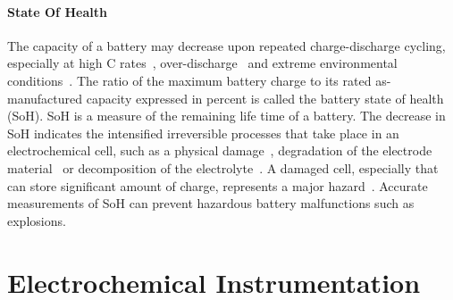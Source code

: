 \paragraph{State Of Health}
The capacity of a battery may decrease upon repeated charge-discharge cycling, especially at high C rates~\cite{Guan2018,Ouyang2020}, over-discharge~\cite{Ma2020} and extreme environmental conditions~\cite{Zhang2022}. The ratio of the maximum battery charge to its rated as-manufactured capacity expressed in percent is called the battery state of health (SoH). SoH is a measure of the remaining life time of a battery. The decrease in SoH indicates the intensified irreversible processes that take place in an electrochemical cell, such as a physical damage~\cite{Fu_2015}, degradation of the electrode material~\cite{Ma2020,Kulikov2022} or decomposition of the electrolyte~\cite{Fang_2021}. A damaged cell, especially that can store significant amount of charge, represents a major hazard~\cite{Ma2020}. Accurate measurements of SoH can prevent hazardous battery malfunctions such as explosions.

\section{Electrochemical Instrumentation}
